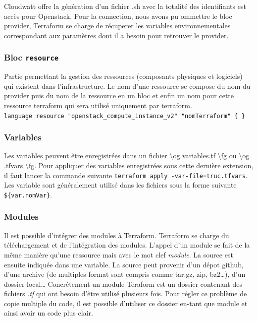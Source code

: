 \documentclass[]{article}
\begin{document}
Cloudwatt offre la génération d'un fichier .sh avec la totalité des
identifiants est accès pour Openstack. Pour la connection, nous avons pu
ommettre le bloc provider, Terraform se charge de récuperer les
variables environnementales correspondant aux paramètres dont il a
besoin pour retrouver le provider.

\subsubsection{\texorpdfstring{Bloc
\textbf{\texttt{resource}}}{Bloc resource}}\label{bloc-resource}

Partie permettant la gestion des ressources (composants physiques et
logiciels) qui existent dans l'infrastructure. Le nom d'une ressource se
compose du nom du provider puis du nom de la ressource en un bloc et
enfin un nom pour cette ressource terraform qui sera utilisé uniquement
par terraform.
\texttt{language\ resource\ "openstack\_compute\_instance\_v2"\ "nomTerraform"\ \{\ \}}

\subsubsection{Variables}\label{variables}

Les variables peuvent être enregistrées dans un fichier
\textbackslash{}og variables.tf \textbackslash{}fg ou \textbackslash{}og
.tfvars \textbackslash{}fg. Pour appliquer des variables enregistrées
sous cette dernière extension, il faut lancer la commande suivante
\texttt{terraform\ apply\ -var-file=truc.tfvars}. Les variable sont
généralement utilisé dans les fichiers sous la forme suivante
\texttt{\$\{var.nomVar\}}.

\subsubsection{Modules}\label{modules}

Il est possible d'intégrer des modules à Terraform. Terraform se charge
du téléchargement et de l'intégration des modules. L'appel d'un module
se fait de la même manière qu'une ressource mais avec le mot clef
\emph{module}. La source est ensuite indiquée dans une variable. La
source peut provenir d'un dépot github, d'une archive (de multiples
format sont compris comme tar.gz, zip, bz2\ldots{}), d'un dossier
local\ldots{} Concrétement un module Teraform est un dossier contenant
des fichiers \emph{.tf} qui ont besoin d'être utilisé plusieurs fois.
Pour régler ce problème de copie multiple du code, il est possible
d'utiliser ce dossier en-tant que module et ainsi avoir un code plus
clair.
\end{document}
